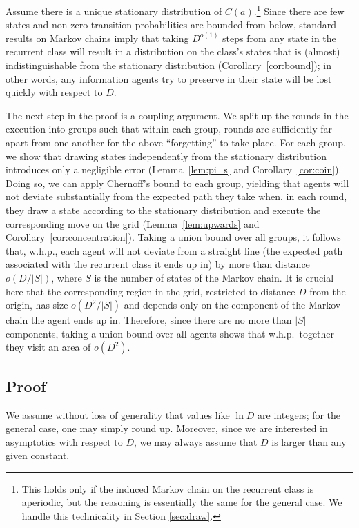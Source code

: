 \documentclass[11pt]{article}
\begin{document}
Assume there is a unique stationary distribution of $C(a)$.\footnote{This holds only if the induced Markov chain on the recurrent class is aperiodic, but the reasoning is essentially the same for the general case. We handle this technicality in Section \ref{sec:draw}.} Since there are few states and non-zero transition probabilities are bounded from below, standard results on Markov chains imply that taking $D^{o(1)}$ steps from any state in the recurrent class will result in a distribution on the class's states that is (almost) indistinguishable from the stationary distribution (Corollary~\ref{cor:bound}); in other words, any information agents try to preserve in their state will be lost quickly with respect to $D$.

The next step in the proof is a coupling argument. We split up the rounds in the execution into groups such that within each group, rounds are sufficiently far apart from one another for the above ``forgetting'' to take place. For each group, we show that drawing states independently from the stationary distribution introduces only a negligible error (Lemma~\ref{lem:pi_s} and Corollary~\ref{cor:coin}). Doing so, we can apply Chernoff's bound to each group, yielding that agents will not deviate substantially from the expected path they take when, in each round, they draw a state according to the stationary distribution and execute the corresponding move on the grid (Lemma~\ref{lem:upwards} and Corollary~\ref{cor:concentration}). Taking a union bound over all groups, it follows that, w.h.p., each agent will not deviate from a straight line (the expected path associated with the recurrent class it ends up in) by more than distance $o(D/|S|)$, where $S$ is the number of states of the Markov chain. It is crucial here that the corresponding region in the grid, restricted to distance $D$ from the origin, has size $o(D^2/|S|)$ and depends only on the component of the Markov chain the agent ends up in. Therefore, since there are no more than $|S|$ components, taking a union bound over all agents shows that w.h.p.\ together they visit an area of $o(D^2)$.


\subsection{Proof}
We assume without loss of generality that values like $\ln D$ are integers; for the general case, one may simply round up. Moreover, since we are interested in asymptotics with respect to $D$, we may always assume that $D$ is larger than any given constant.
\end{document}
